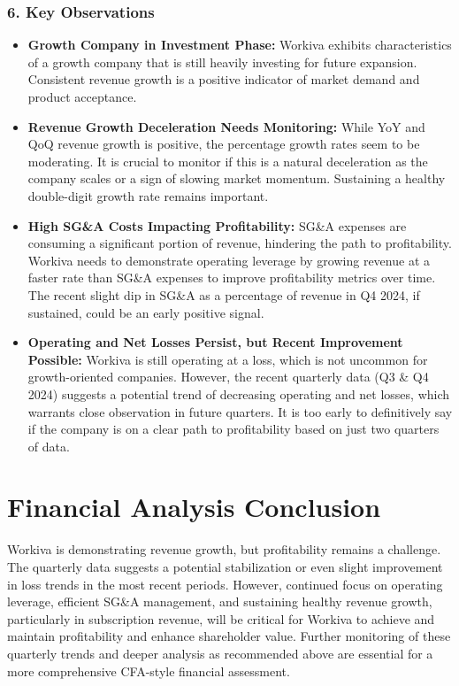 \documentclass[
  10pt,
  a4paper,
]{article}
\providecommand{\tightlist}{%
  \setlength{\itemsep}{0pt}\setlength{\parskip}{0pt}}\usepackage{longtable,booktabs,array}
\begin{document}
\subsubsection{6. Key Observations}\label{key-observations}

\begin{itemize}
\tightlist
\item
  \textbf{Growth Company in Investment Phase:} Workiva exhibits
  characteristics of a growth company that is still heavily investing
  for future expansion. Consistent revenue growth is a positive
  indicator of market demand and product acceptance.
\item
  \textbf{Revenue Growth Deceleration Needs Monitoring:} While YoY and
  QoQ revenue growth is positive, the percentage growth rates seem to be
  moderating. It is crucial to monitor if this is a natural deceleration
  as the company scales or a sign of slowing market momentum. Sustaining
  a healthy double-digit growth rate remains important.
\item
  \textbf{High SG\&A Costs Impacting Profitability:} SG\&A expenses are
  consuming a significant portion of revenue, hindering the path to
  profitability. Workiva needs to demonstrate operating leverage by
  growing revenue at a faster rate than SG\&A expenses to improve
  profitability metrics over time. The recent slight dip in SG\&A as a
  percentage of revenue in Q4 2024, if sustained, could be an early
  positive signal.
\item
  \textbf{Operating and Net Losses Persist, but Recent Improvement
  Possible:} Workiva is still operating at a loss, which is not uncommon
  for growth-oriented companies. However, the recent quarterly data (Q3
  \& Q4 2024) suggests a potential trend of decreasing operating and net
  losses, which warrants close observation in future quarters. It is too
  early to definitively say if the company is on a clear path to
  profitability based on just two quarters of data.
\end{itemize}

\section{Financial Analysis
Conclusion}\label{financial-analysis-conclusion}

Workiva is demonstrating revenue growth, but profitability remains a
challenge. The quarterly data suggests a potential stabilization or even
slight improvement in loss trends in the most recent periods. However,
continued focus on operating leverage, efficient SG\&A management, and
sustaining healthy revenue growth, particularly in subscription revenue,
will be critical for Workiva to achieve and maintain profitability and
enhance shareholder value. Further monitoring of these quarterly trends
and deeper analysis as recommended above are essential for a more
comprehensive CFA-style financial assessment.
\end{document}
